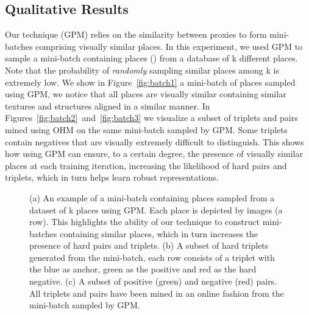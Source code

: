 \documentclass{bmvc2k}
\begin{document}
\subsection{Qualitative Results}\label{ssec:qualitative}
Our technique (GPM) relies on the similarity between proxies to form mini-batches comprising visually similar places. In this experiment, we used GPM to sample a mini-batch containing  places () from a database of k different places. Note that the probability of \emph{randomly} sampling  similar places among k is extremely low. We show in Figure~\ref{fig:batch1} a mini-batch of  places sampled using GPM, we notice that all  places are visually similar containing similar textures and structures aligned in a similar manner. In Figures~\ref{fig:batch2}~and~\ref{fig:batch3} we visualize a subset of triplets and pairs mined using OHM on the same mini-batch sampled by GPM. Some triplets contain negatives that are visually extremely difficult to distinguish. This shows how using GPM can ensure, to a certain degree, the presence of visually similar places at each training iteration, increasing the likelihood of hard pairs and triplets, which in turn helps learn robust representations.
\begin{figure}[thb]\centering
{}
\hfill
{}
\hfill
{}
\vspace{3pt}
\caption{\small (a) An example of a mini-batch containing  places sampled from a dataset of k places using GPM. Each place is depicted by  images (a row). This highlights the ability of our technique to construct mini-batches containing similar places, which in turn increases the presence of hard pairs and triplets. (b) A subset of hard triplets generated from the mini-batch, each row consists of a triplet with the blue as anchor, green as the positive and red as the hard negative. (c) A subset of positive (green) and negative (red) pairs. All triplets and pairs have been mined in an online fashion from the mini-batch sampled by GPM.}
\label{fig:a_batch}
\end{figure}
\end{document}
